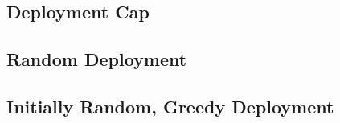 \subsection{Deployment Cap}




\subsection{Random Deployment}




\subsection{Initially Random, Greedy Deployment}




